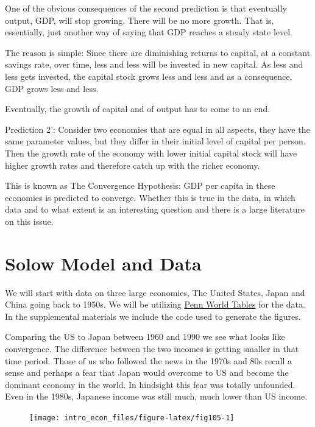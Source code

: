 \documentclass[
]{book}
\begin{document}
One of the obvious consequences of the second prediction is that eventually output, GDP, will stop growing. There will be no more growth. That is, essentially, just another way of saying that GDP reaches a steady state level.

The reason is simple: Since there are diminishing returns to capital, at a constant savings rate, over time, less and less will be invested in new capital. As less and less gets invested, the capital stock grows less and less and as a consequence, GDP grows less and less.

Eventually, the growth of capital and of output has to come to an end.

Prediction 2': Consider two economies that are equal in all aspects, they have the same parameter values, but they differ in their initial level of capital per person. Then the growth rate of the economy with lower initial capital stock will have higher growth rates and therefore catch up with the richer economy.

This is known as The Convergence Hypothesis: GDP per capita in these economies is predicted to converge. Whether this is true in the data, in which data and to what extent is an interesting question and there is a large literature on this issue.

\hypertarget{solow-model-and-data}{%
\section{Solow Model and Data}\label{solow-model-and-data}}

We will start with data on three large economies, The United States, Japan and China going back to 1950s. We will be utilizing \href{https://www.rug.nl/ggdc/productivity/pwt/?lang=en}{Penn World Tables} for the data. In the supplemental materials we include the code used to generate the figures.

Comparing the US to Japan between 1960 and 1990 we see what looks like convergence. The difference between the two incomes is getting smaller in that time period. Those of us who followed the news in the 1970s and 80s recall a sense and perhaps a fear that Japan would overcome to US and become the dominant economy in the world. In hindsight this fear was totally unfounded. Even in the 1980s, Japanese income was still much, much lower than US income.

\begin{figure}

{\centering \texttt{[image: intro\_econ\_files/figure-latex/fig105-1]} 

}

\end{figure}
\end{document}
